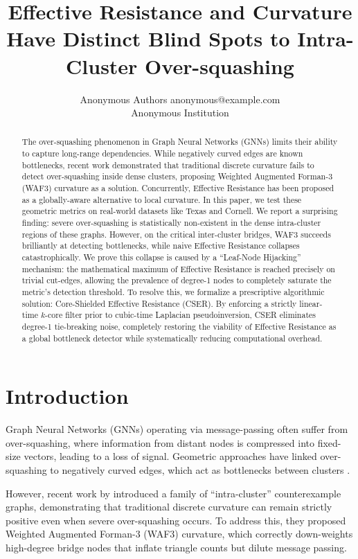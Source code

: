 \documentclass[10pt]{article} %
\title{Effective Resistance and Curvature Have Distinct Blind Spots to Intra-Cluster Over-squashing}
\author{\name Anonymous Authors \email anonymous@example.com \\
      \addr Anonymous Institution}
\begin{document}
\maketitle

\begin{abstract}
The over-squashing phenomenon in Graph Neural Networks (GNNs) limits their ability to capture long-range dependencies. While negatively curved edges are known bottlenecks, recent work demonstrated that traditional discrete curvature fails to detect over-squashing inside dense clusters, proposing Weighted Augmented Forman-3 (WAF3) curvature as a solution. Concurrently, Effective Resistance has been proposed as a globally-aware alternative to local curvature. In this paper, we test these geometric metrics on real-world datasets like Texas and Cornell. We report a surprising finding: severe over-squashing is statistically non-existent in the dense intra-cluster regions of these graphs. However, on the critical inter-cluster bridges, WAF3 succeeds brilliantly at detecting bottlenecks, while naive Effective Resistance collapses catastrophically. We prove this collapse is caused by a ``Leaf-Node Hijacking'' mechanism: the mathematical maximum of Effective Resistance is reached precisely on trivial cut-edges, allowing the prevalence of degree-1 nodes to completely saturate the metric's detection threshold. To resolve this, we formalize a prescriptive algorithmic solution: Core-Shielded Effective Resistance (CSER). By enforcing a strictly linear-time $k$-core filter prior to cubic-time Laplacian pseudoinversion, CSER eliminates degree-1 tie-breaking noise, completely restoring the viability of Effective Resistance as a global bottleneck detector while systematically reducing computational overhead.
\end{abstract}

\section{Introduction}
Graph Neural Networks (GNNs) operating via message-passing often suffer from over-squashing, where information from distant nodes is compressed into fixed-size vectors, leading to a loss of signal. Geometric approaches have linked over-squashing to negatively curved edges, which act as bottlenecks between clusters \citep{Topping2022}.

However, recent work by \citet{Chen2026} introduced a family of ``intra-cluster'' counterexample graphs, demonstrating that traditional discrete curvature can remain strictly positive even when severe over-squashing occurs. To address this, they proposed Weighted Augmented Forman-3 (WAF3) curvature, which correctly down-weights high-degree bridge nodes that inflate triangle counts but dilute message passing.
\end{document}
